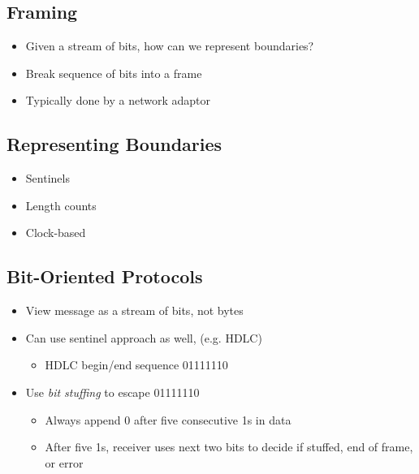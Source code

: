 \begin{figure}[H]
\end{figure}

\subsection{Framing}
\begin{itemize}[nosep]
    \item Given a stream of bits, how can we represent boundaries?
    \item Break sequence of bits into a frame
    \item Typically done by a network adaptor
\end{itemize}

\subsection{Representing Boundaries}
\begin{itemize}[nosep]
    \item Sentinels
    \item Length counts
    \item Clock-based
\end{itemize}

\subsection{Bit-Oriented Protocols}
\begin{itemize}[nosep]
    \item View message as a stream of bits, not bytes
    \item Can use sentinel approach as well, (e.g. HDLC)
          \begin{itemize}[nosep]
              \item HDLC begin/end sequence 01111110
          \end{itemize}
    \item Use \emph{bit stuffing} to escape 01111110
          \begin{itemize}[nosep]
              \item Always append 0 after five consecutive 1s in data
              \item After five 1s, receiver uses next two bits to decide if stuffed, end of frame, or error
          \end{itemize}
\end{itemize}

